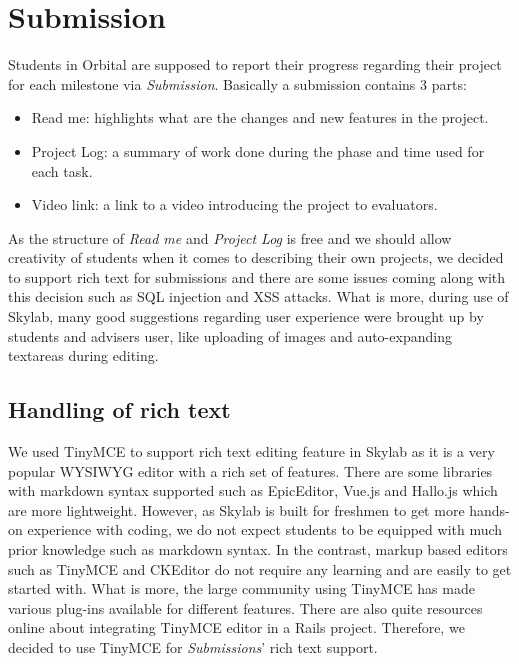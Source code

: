 \chapter{Submission} \label{submission}

Students in Orbital are supposed to report their progress regarding their project for each milestone via \textit{Submission}. Basically a submission contains 3 parts:

\begin{itemize}
  \item Read me: highlights what are the changes and new features in the project.
  \item Project Log: a summary of work done during the phase and time used for each task.
  \item Video link: a link to a video introducing the project to evaluators.
\end{itemize}

As the structure of \textit{Read me} and \textit{Project Log} is free and we should allow creativity of students when it comes to describing their own projects, we decided to support rich text for submissions and there are some issues coming along with this decision such as SQL injection and XSS attacks. What is more, during use of Skylab, many good suggestions regarding user experience were brought up by students and advisers user, like uploading of images and auto-expanding textareas during editing.

\section{Handling of rich text}
We used TinyMCE to support rich text editing feature in Skylab as it is a very popular WYSIWYG editor with a rich set of features\cite{citation10}. There are some libraries with markdown syntax supported such as EpicEditor, Vue.js and Hallo.js which are more lightweight. However, as Skylab is built for freshmen to get more hands-on experience with coding, we do not expect students to be equipped with much prior knowledge such as markdown syntax. In the contrast, markup based editors such as TinyMCE and CKEditor do not require any learning and are easily to get started with. What is more, the large community using TinyMCE has made various plug-ins available for different features. There are also quite resources online about integrating TinyMCE editor in a Rails project. Therefore, we decided to use TinyMCE for \textit{Submissions}' rich text support.

